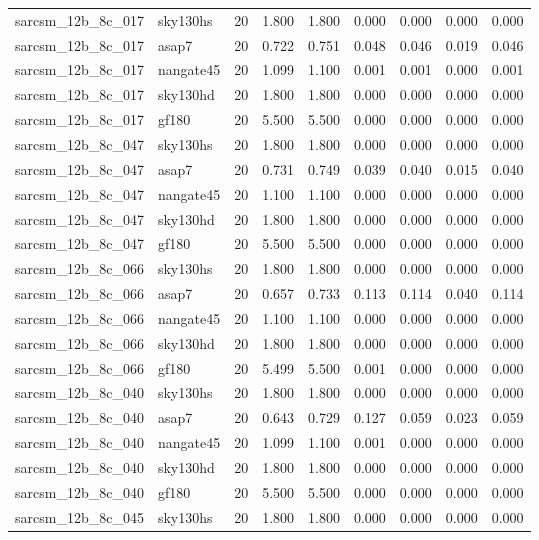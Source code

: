 \begin{tabular}{llrrrrrrr}
sarcsm\_12b\_8c\_017 & sky130hs & 20 & 1.800 & 1.800 & 0.000 & 0.000 & 0.000 & 0.000 \\
sarcsm\_12b\_8c\_017 & asap7 & 20 & 0.722 & 0.751 & 0.048 & 0.046 & 0.019 & 0.046 \\
sarcsm\_12b\_8c\_017 & nangate45 & 20 & 1.099 & 1.100 & 0.001 & 0.001 & 0.000 & 0.001 \\
sarcsm\_12b\_8c\_017 & sky130hd & 20 & 1.800 & 1.800 & 0.000 & 0.000 & 0.000 & 0.000 \\
sarcsm\_12b\_8c\_017 & gf180 & 20 & 5.500 & 5.500 & 0.000 & 0.000 & 0.000 & 0.000 \\
sarcsm\_12b\_8c\_047 & sky130hs & 20 & 1.800 & 1.800 & 0.000 & 0.000 & 0.000 & 0.000 \\
sarcsm\_12b\_8c\_047 & asap7 & 20 & 0.731 & 0.749 & 0.039 & 0.040 & 0.015 & 0.040 \\
sarcsm\_12b\_8c\_047 & nangate45 & 20 & 1.100 & 1.100 & 0.000 & 0.000 & 0.000 & 0.000 \\
sarcsm\_12b\_8c\_047 & sky130hd & 20 & 1.800 & 1.800 & 0.000 & 0.000 & 0.000 & 0.000 \\
sarcsm\_12b\_8c\_047 & gf180 & 20 & 5.500 & 5.500 & 0.000 & 0.000 & 0.000 & 0.000 \\
sarcsm\_12b\_8c\_066 & sky130hs & 20 & 1.800 & 1.800 & 0.000 & 0.000 & 0.000 & 0.000 \\
sarcsm\_12b\_8c\_066 & asap7 & 20 & 0.657 & 0.733 & 0.113 & 0.114 & 0.040 & 0.114 \\
sarcsm\_12b\_8c\_066 & nangate45 & 20 & 1.100 & 1.100 & 0.000 & 0.000 & 0.000 & 0.000 \\
sarcsm\_12b\_8c\_066 & sky130hd & 20 & 1.800 & 1.800 & 0.000 & 0.000 & 0.000 & 0.000 \\
sarcsm\_12b\_8c\_066 & gf180 & 20 & 5.499 & 5.500 & 0.001 & 0.000 & 0.000 & 0.000 \\
sarcsm\_12b\_8c\_040 & sky130hs & 20 & 1.800 & 1.800 & 0.000 & 0.000 & 0.000 & 0.000 \\
sarcsm\_12b\_8c\_040 & asap7 & 20 & 0.643 & 0.729 & 0.127 & 0.059 & 0.023 & 0.059 \\
sarcsm\_12b\_8c\_040 & nangate45 & 20 & 1.099 & 1.100 & 0.001 & 0.000 & 0.000 & 0.000 \\
sarcsm\_12b\_8c\_040 & sky130hd & 20 & 1.800 & 1.800 & 0.000 & 0.000 & 0.000 & 0.000 \\
sarcsm\_12b\_8c\_040 & gf180 & 20 & 5.500 & 5.500 & 0.000 & 0.000 & 0.000 & 0.000 \\
sarcsm\_12b\_8c\_045 & sky130hs & 20 & 1.800 & 1.800 & 0.000 & 0.000 & 0.000 & 0.000 \\

\end{tabular}
